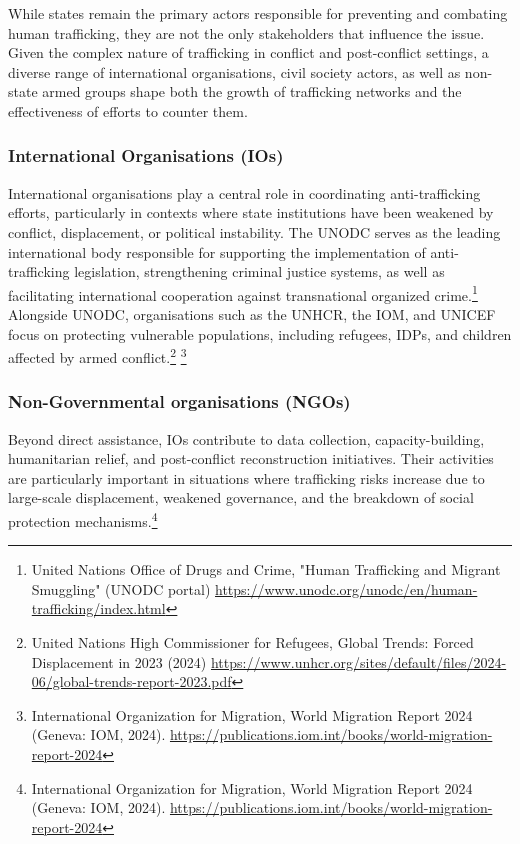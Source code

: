 While states remain the primary actors responsible for preventing and combating human trafficking, they are not the only stakeholders that influence the issue. Given the complex nature of trafficking in conflict and post-conflict settings, a diverse range of international organisations, civil society actors, as well as non-state armed groups shape both the growth of trafficking networks and the effectiveness of efforts to counter them.

\subsubsection{International Organisations (IOs)}

International  organisations  play  a  central  role  in  coordinating anti-trafficking efforts, particularly in contexts where state institutions have been weakened by conflict, displacement, or political instability. The UNODC serves as the leading international body responsible for supporting the implementation of anti-trafficking legislation, strengthening criminal justice systems, as well as facilitating international cooperation against transnational organized crime.\footnote{United Nations Office of Drugs and Crime, "Human Trafficking and Migrant Smuggling" (UNODC portal) \url{https://www.unodc.org/unodc/en/human-trafficking/index.html}} Alongside UNODC, organisations such as the UNHCR, the IOM, and UNICEF focus on protecting vulnerable populations, including refugees, IDPs, and children affected by armed conflict.\footnote{United Nations High Commissioner for Refugees, Global Trends: Forced Displacement in 2023 (2024) \url{https://www.unhcr.org/sites/default/files/2024-06/global-trends-report-2023.pdf}} \footnote{International Organization for Migration, World Migration Report 2024 (Geneva: IOM, 2024). \url{https://publications.iom.int/books/world-migration-report-2024}}

\subsubsection{Non-Governmental organisations (NGOs)}

Beyond direct assistance, IOs contribute to data collection, capacity-building, humanitarian relief, and post-conflict reconstruction initiatives. Their activities are particularly important in situations where trafficking risks increase due to large-scale displacement, weakened governance, and the breakdown of social protection mechanisms.\footnote{International Organization for Migration, World Migration Report 2024 (Geneva: IOM, 2024). \url{https://publications.iom.int/books/world-migration-report-2024}}

